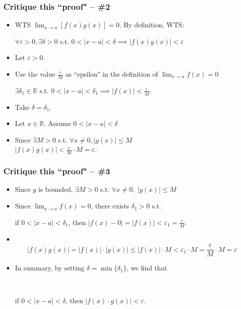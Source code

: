 \documentclass[14pt]{beamer}
\newcommand {\DS} [1] {${\displaystyle #1}$}
\newcommand {\R}{\mathbb{R}}
\newcommand{\e}{\varepsilon}
\newcommand{\setsize}[1]{\fontsize{#1}{#1}\selectfont} %
\newcommand{\smallerfont}{\setsize{13}} %
\begin{document}
\begin{frame}[t]
\frametitle{Critique this ``proof" -- \#2}
\smallerfont
\begin{itemize}
	\item  WTS \DS{\lim_{x \to a} \left[f(x) g(x) \right] =0}.  By definition, WTS:
	
		\hfill \DS{\forall \e>0, \exists \delta>0} s.t. \DS{0<|x-a|<\delta \implies |f(x) g(x)|<\e }
\vfill
	\item  Let $\e >0$.  
\vfill
	\item Use the value \DS{\frac{\e}{M}} as ``epsilon" in the definition of \DS{\lim_{x \to a} f(x) = 0}
		
		\hfill  \DS{\exists \delta_1 \in \R} s.t. \DS{0<|x-a|<\delta_1 \implies |f(x)| <  \frac{\e}{M} }.
\vfill
	\item Take \DS{\delta = \delta_1}.
\vfill
	\item  Let \DS{x \in \R}.  Assume \DS{0 < |x-a| <\delta}
\vfill
	\item  Since \DS{\exists M>0} s.t. \DS{\forall x \neq 0, |g(x)| \leq M} \\
		\hfill \DS{|f(x) g(x)| < \frac{\e}{M} \cdot M = \e}.
\vfill
\end{itemize}

\end{frame}

\begin{frame}[t]
\frametitle{Critique this ``proof" -- \#3}
\smallerfont
\begin{itemize}
	\item  Since $g$ is bounded, \DS{\exists M >0} \; s.t. \; \;\DS{\forall x \neq 0, \; |g(x)| \leq M}
\vfill
	\item  Since \DS{\lim_{x \to a} f(x)=0}, there exists \DS{\delta_1 >0} s.t. 
	
		if \DS{0<|x-a|<\delta_1}, \quad then \; \DS{|f(x)-0| = |f(x)| <\e_1 = \frac{\e}{M}}.
\vfill
	\item \ \vspace{-1cm}
		$$ 
			|f(x)g(x)| = |f(x)| \cdot |g(x)| \leq |f(x)| \cdot M < \e_1 \cdot M = \frac{\e}{M} \cdot M = \e
		$$
	\item  In summary, by setting \DS{\delta = \min\{\delta_1 \}}, we find that
	
	\
	
	if \DS{0<|x-a|<\delta}, \quad then \; \DS{|f(x) \cdot g(x)| < \e}.
\vfill
\end{itemize}
\end{frame}
\end{document}

